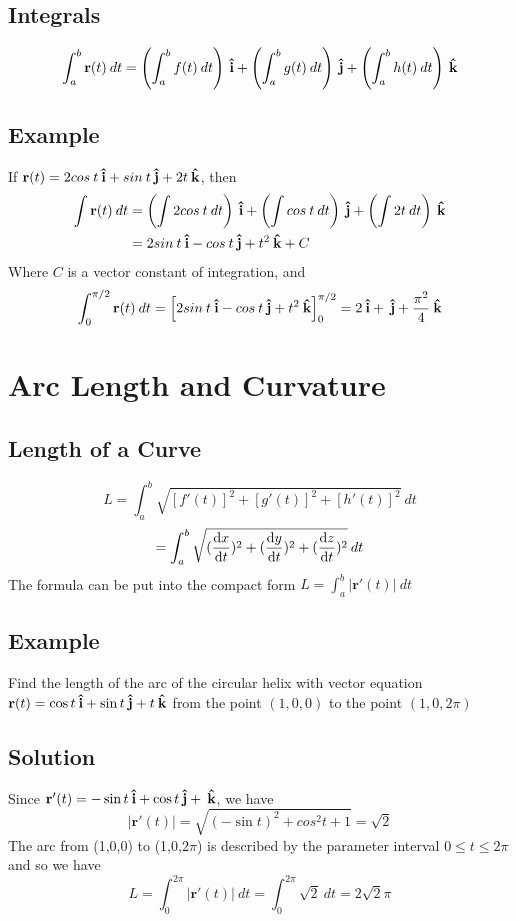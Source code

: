 \subsection*{Integrals}
$$\int_a^b\textbf{r}(t)\:dt=\left(\int_a^bf(t)\:dt\right)\:\boldsymbol{\hat{\textbf{i}}}+\left(\int_a^bg(t)\:dt\right)
    \:\boldsymbol{\hat{\textbf{j}}}+\left(\int_a^bh(t)\:dt\right)\:\boldsymbol{\hat{\textbf{k}}}$$

\subsection*{Example}
If $\textbf{r}(t)=2cos\:t\:\boldsymbol{\hat{\textbf{i}}}+sin\:t\:\boldsymbol{\hat{\textbf{j}}}+2t\:\boldsymbol{\hat{\textbf{k}}}$, then
\begin{align*}
    \int\textbf{r}(t)\:dt & =\left(\int 2cos\:t\:dt\right)\:\boldsymbol{\hat{\textbf{i}}}+\left(\int cos\:t\:dt\right)\:\boldsymbol{\hat{\textbf{j}}}+\left(\int 2t\:dt\right)\:\boldsymbol{\hat{\textbf{k}}} \\
                          & =2sin\:t\:\boldsymbol{\hat{\textbf{i}}}-cos\:t\:\boldsymbol{\hat{\textbf{j}}}+t^2\:\boldsymbol{\hat{\textbf{k}}}+C
\end{align*}
Where $C$ is a vector constant of integration, and
$$\int_0^{\pi/2}\textbf{r}(t)\:dt=\left[2sin\:t\:\boldsymbol{\hat{\textbf{i}}}-cos\:t\:\boldsymbol{\hat{\textbf{j}}}+t^2\:\boldsymbol{\hat{\textbf{k}}}\right]_0^{\pi/2}=
    2\:\boldsymbol{\hat{\textbf{i}}}+\:\boldsymbol{\hat{\textbf{j}}}+\frac{\pi^2}{4}\:\boldsymbol{\hat{\textbf{k}}}$$

\section{Arc Length and Curvature}

\subsection*{Length of a Curve}
$$L=\int_a^b\sqrt{[f'(t)]^2+[g'(t)]^2+[h'(t)]^2}\:dt$$
$$=\int_a^b\sqrt{(\dv{x}{t})^2+(\dv{y}{t})^2+(\dv{z}{t})^2}\:dt$$
The formula can be put into the compact form $L=\int_a^b|\textbf{r}'(t)|\:dt$

\subsection*{Example}
Find the length of the arc of the circular helix with vector equation
$\textbf{r}(t)=\cos{t}\:\boldsymbol{\hat{\textbf{i}}}+\sin{t}\:\boldsymbol{\hat{\textbf{j}}}+t\:\boldsymbol{\hat{\textbf{k}}}$ from the point $(1,0,0)$ to the
point $(1,0,2\pi)$

\subsection*{Solution}
Since $\textbf{r}'(t)=-\sin{t}\:\boldsymbol{\hat{\textbf{i}}}+\cos{t}\:\boldsymbol{\hat{\textbf{j}}}+\:\boldsymbol{\hat{\textbf{k}}}$, we have
$$|\textbf{r}'(t)|=\sqrt{(-\sin{t})^2+cos^2t+1}=\sqrt{2}$$
The arc from (1,0,0) to (1,0,$2\pi$) is described by the parameter interval
$0\leq t\leq 2\pi$ and so we have
$$L=\int_0^{2\pi}|\textbf{r}'(t)|\:dt=\int_0^{2\pi}\sqrt{2}\:dt=2\sqrt{2}\pi$$

